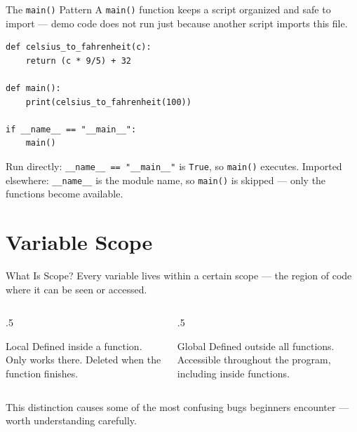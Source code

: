 \documentclass[9pt,aspectratio=169,xcolor=table]{beamer}
\begin{document}
\begin{frame}[fragile]{The \texttt{main()} Pattern}
    \leavevmode
    A \lstinline{main()} function keeps a script organized and safe to
    import --- demo code does not run just because another script
    imports this file.

\begin{lstlisting}
def celsius_to_fahrenheit(c):
    return (c * 9/5) + 32

def main():
    print(celsius_to_fahrenheit(100))

if __name__ == "__main__":
    main()
\end{lstlisting}

    \vspace{1mm}
    {\small Run directly: \texttt{\_\_name\_\_ == "\_\_main\_\_"} is
    \texttt{True}, so \texttt{main()} executes. Imported elsewhere:
    \texttt{\_\_name\_\_} is the module name, so \texttt{main()} is
    skipped --- only the functions become available.}
\end{frame}

\section{Variable Scope}

\begin{frame}{What Is Scope?}
    \leavevmode
    Every variable lives within a certain \alert{scope} --- the region
    of code where it can be seen or accessed.

    \vspace{3mm}
    \begin{columns}[t]
        \begin{column}{.5\textwidth}
            \begin{block}{Local}
                \small Defined inside a function. Only works there.
                Deleted when the function finishes.
            \end{block}
        \end{column}
        \begin{column}{.5\textwidth}
            \begin{block}{Global}
                \small Defined outside all functions. Accessible
                throughout the program, including inside functions.
            \end{block}
        \end{column}
    \end{columns}

    \vspace{3mm}
    {\small This distinction causes some of the most confusing bugs
    beginners encounter --- worth understanding carefully.}
\end{frame}
\end{document}
